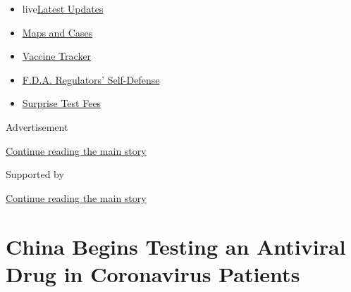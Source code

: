 \begin{itemize}
\tightlist
\item
  live\href{https://www.nytimes3xbfgragh.onion/2020/09/11/world/covid-19-coronavirus.html?name=styln-coronavirus-national\&region=TOP_BANNER\&block=storyline_menu_recirc\&action=click\&pgtype=Article\&impression_id=49b7f601-f4cc-11ea-ba51-959d423cf41a\&variant=undefined}{Latest
  Updates}
\item
  \href{https://www.nytimes3xbfgragh.onion/interactive/2020/us/coronavirus-us-cases.html?name=styln-coronavirus-national\&region=TOP_BANNER\&block=storyline_menu_recirc\&action=click\&pgtype=Article\&impression_id=49b7f602-f4cc-11ea-ba51-959d423cf41a\&variant=undefined}{Maps
  and Cases}
\item
  \href{https://www.nytimes3xbfgragh.onion/interactive/2020/science/coronavirus-vaccine-tracker.html?name=styln-coronavirus-national\&region=TOP_BANNER\&block=storyline_menu_recirc\&action=click\&pgtype=Article\&impression_id=49b81d10-f4cc-11ea-ba51-959d423cf41a\&variant=undefined}{Vaccine
  Tracker}
\item
  \href{https://www.nytimes3xbfgragh.onion/2020/09/10/us/politics/fda-coronavirus-vaccine.html?name=styln-coronavirus-national\&region=TOP_BANNER\&block=storyline_menu_recirc\&action=click\&pgtype=Article\&impression_id=49b81d11-f4cc-11ea-ba51-959d423cf41a\&variant=undefined}{F.D.A.
  Regulators' Self-Defense}
\item
  \href{https://www.nytimes3xbfgragh.onion/2020/09/09/upshot/coronavirus-surprise-test-fees.html?name=styln-coronavirus-national\&region=TOP_BANNER\&block=storyline_menu_recirc\&action=click\&pgtype=Article\&impression_id=49b81d12-f4cc-11ea-ba51-959d423cf41a\&variant=undefined}{Surprise
  Test Fees}
\end{itemize}

Advertisement

\protect\hyperlink{after-top}{Continue reading the main story}

Supported by

\protect\hyperlink{after-sponsor}{Continue reading the main story}

\hypertarget{china-begins-testing-an-antiviral-drug-in-coronavirus-patients}{%
\section{China Begins Testing an Antiviral Drug in Coronavirus
Patients}\label{china-begins-testing-an-antiviral-drug-in-coronavirus-patients}}


